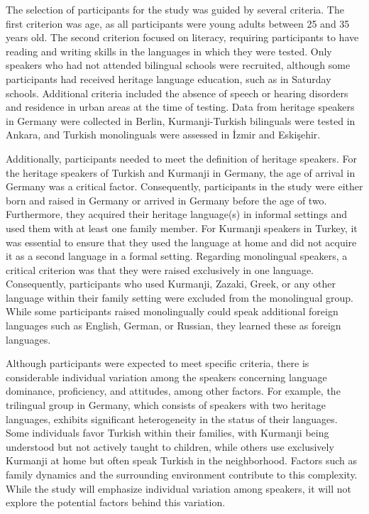 The selection of participants for the study was guided by several criteria. The first criterion was age, as all participants were young adults between 25 and 35 years old. The second criterion focused on literacy, requiring participants to have reading and writing skills in the languages in which they were tested. Only speakers who had not attended bilingual schools were recruited, although some participants had received heritage language education, such as in Saturday schools. Additional criteria included the absence of speech or hearing disorders and residence in urban areas at the time of testing. Data from heritage speakers in Germany were collected in Berlin, Kurmanji-Turkish bilinguals were tested in Ankara, and Turkish monolinguals were assessed in İzmir and Eskişehir.

Additionally, participants needed to meet the definition of heritage speakers. For the heritage speakers of Turkish and Kurmanji in Germany, the age of arrival in Germany was a critical factor. Consequently, participants in the study were either born and raised in Germany or arrived in Germany before the age of two. Furthermore, they acquired their heritage language(s) in informal settings and used them with at least one family member. For Kurmanji speakers in Turkey, it was essential to ensure that they used the language at home and did not acquire it as a second language in a formal setting. Regarding monolingual speakers, a critical criterion was that they were raised exclusively in one language. Consequently, participants who used Kurmanji, Zazaki, Greek, or any other language within their family setting were excluded from the monolingual group. While some participants raised monolingually could speak additional foreign languages such as English, German, or Russian, they learned these as foreign languages.

Although participants were expected to meet specific criteria, there is considerable individual variation among the speakers concerning language dominance, proficiency, and attitudes, among other factors. For example, the trilingual group in Germany, which consists of speakers with two heritage languages, exhibits significant heterogeneity in the status of their languages. Some individuals favor Turkish within their families, with Kurmanji being understood but not actively taught to children, while others use exclusively Kurmanji at home but often speak Turkish in the neighborhood. Factors such as family dynamics and the surrounding environment contribute to this complexity. While the study will emphasize individual variation among speakers, it will not explore the potential factors behind this variation.


